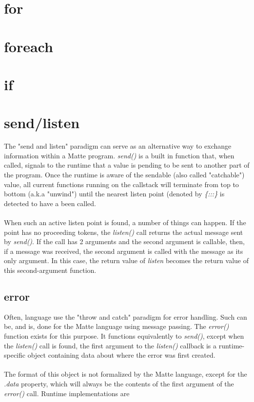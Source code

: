 \documentclass[12pt,letterpaper]{report}
\begin{document}
\section{for}\label{for}
\section{foreach}\label{foreach}
\section{if}\label{if}
\section{send/listen}\label{send/listen}

The "send and listen" paradigm can serve as an alternative way to exchange information within 
a Matte program. \textit{send()} is a built in function that, when called, signals to the runtime
that a value is pending to be sent to another part of the program. Once the runtime is aware of 
the sendable (also called "catchable") value, all current functions running on the callstack 
will terminate from top to bottom (a.k.a "unwind") until the nearest listen point
(denoted by \textit{\{:::\}} is detected to have a been called.
\\\\
When such an active listen point is found, a number of things can happen.
If the point has no proceeding tokens, the \textit{listen()} call returns 
the actual message sent by \textit{send()}. If the call has 2 arguments and the second 
argument is callable, then, if a message was received, the second argument is called 
with the message as its only argument. In this case, the return value of \textit{listen} 
becomes the return value of this second-argument function.



\subsection{error}\label{error}

Often, language use the "throw and catch" paradigm for error handling. Such can be, and is, done 
for the Matte language using message passing. The \textit{error()} function exists for this purpose. It functions 
equivalently to \textit{send()}, except when the \textit{listen()} call is found, the first argument 
to the \textit{listen()} callback is a runtime-specific object containing data about where the error 
was first created. 
\\\\
The format of this object is not formalized by the Matte language, except for the 
\textit{.data} property, which will always be the contents of the first argument 
of the \textit{error()} call. Runtime implementations are 
\end{document}
